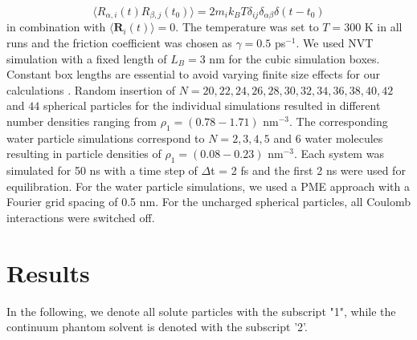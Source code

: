 \documentclass[aip,jcp,reprint]{revtex4-1}
\begin{document}
\begin{equation}
\langle R_{\alpha,i}(t)R_{\beta,j}(t_0)\rangle = 2 m_i k_BT \delta_{ij}\delta_{\alpha\beta}\delta(t-t_0)
\end{equation}
in combination with  $\langle {\textbf{R}}_i(t)\rangle = 0 $. The temperature was set to $T=300$ K in all runs and the friction coefficient was chosen as $\gamma = 0.5$ ps$^{-1}$. 
We used NVT simulation with a fixed length of $L_B = 3$ nm for the cubic simulation boxes. Constant box lengths are essential to avoid varying finite size effects for our calculations \cite{yeh04a}. Random insertion of $N=20, 22, 24, 26, 28, 30, 32,34,36, 38, 40, 42$ and $44$ spherical particles for the individual  simulations resulted in different number densities ranging from $\rho_1 =  (0.78 - 1.71)$ nm$^{-3}$. The corresponding water particle simulations correspond to $N = 2,3,4,5$ and 6 water molecules resulting in particle densities of $\rho_1 = (0.08 - 0.23)$ nm$^{-3}$. Each system was simulated for 50 ns with a time step of $\Delta$t = 2 fs and the first 2 ns were used for equilibration. For the water particle simulations, we used a PME approach \cite{darden93a} with a Fourier grid spacing of 0.5 nm. For the uncharged spherical particles, all Coulomb interactions were switched off.


\section{Results}
In the following, we denote all solute particles with the subscript "1", while the continuum phantom solvent is denoted with the subscript '2'.
\end{document}
